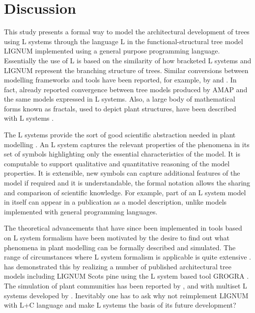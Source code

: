 \section{Discussion}

This  study   presents  a  formal  way  to   model  the  architectural
development  of   trees  using  L  systems  through   the  language  L
\citep{pp:99a}   in  the   functional-structural  tree   model  LIGNUM
implemented using a general purpose programming language.  Essentially
the use of L is based on the similarity of how bracketed L systems and
LIGNUM   represent  the   branching  structure   of   trees.   Similar
conversions between modelling frameworks and tools have been reported,
for example, by  \citet{ferraro:02} and \citet{dzierzon:03}.  In fact,
already  \citet{kurth:94b} reported  convergence  between tree  models
produced by AMAP and the same  models expressed in L systems.  Also, a
large body  of mathematical  forms known as  fractals, used  to depict
plant structures, have been described with L systems \citep{kurth:99}.

The L systems  provide the sort of good  scientific abstraction needed
in plant modelling \citep[c.f.][]{regev:02}.  An L system captures the
relevant  properties   of  the  phenomena   in  its  set   of  symbols
highlighting only  the essential characteristics of the  model.  It is
computable to  support qualitative  and quantitative reasoning  of the
model  properties.    It  is  extensible,  new   symbols  can  capture
additional features of the model if required and it is understandable,
the formal  notation allows the  sharing and comparison  of scientific
knowledge.   For example,  part of  an L  system model  in  itself can
appear  in  a  publication  as  a  model  description,  unlike  models
implemented with general programming languages.

The theoretical advancements that have since been implemented in tools
based on L system formalism have  been motivated by the desire to find
out what  phenomena in plant  modelling can be formally  described and
simulated.   The range of  circumstances where  L system  formalism is
applicable  is quite  extensive  \citep{pp:99}.  \citet{kurth:99}  has
demonstrated  this by  realizing a  number of  published architectural
tree models including LIGNUM Scots pine \citep{perttunen:96} using the
L system based tool  GROGRA \citep{kurth:94}.  The simulation of plant
communities has been  reported by \citet{deussen:98}, \citet{kurth:99}
and with multiset L  systems developed by \citet{lane:02}.  Inevitably
one  has  to  ask  why   not  reimplement  LIGNUM  with  L+C  language
\citep{karwowski:02,karwowski:03} and make L  systems the basis of its
future development?

